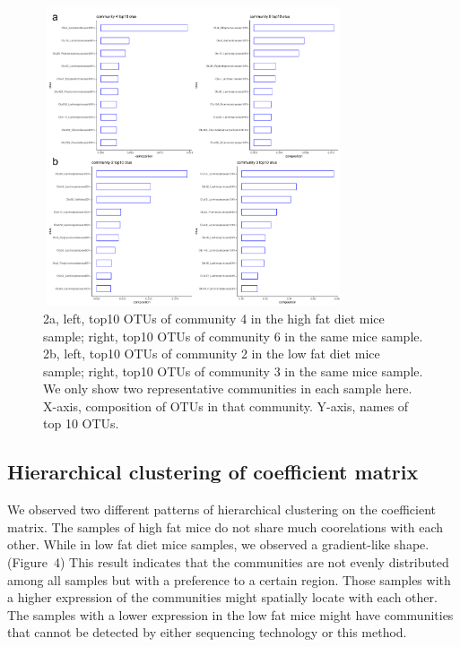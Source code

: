 \documentclass{bioinfo}
\begin{document}
\begin{figure}[!tpb]%
	\centerline{\includegraphics[width=250pt,height=250pt,keepaspectratio]{fig_2.pdf}}
	\caption{2a, left, top10 OTUs of community 4 in the high fat diet mice sample; right, top10 OTUs of community 6 in the same mice sample. 2b, left, top10 OTUs of community 2 in the low fat diet mice sample; right, top10 OTUs of community 3 in the same mice sample. We only show two representative communities in each sample here. X-axis, composition of OTUs in that community. Y-axis, names of top 10 OTUs.} \label{fig:02}
\end{figure}

\subsection{Hierarchical clustering of coefficient matrix}
We observed two different patterns of hierarchical clustering on the coefficient matrix. The samples of high fat mice do not share much coorelations with each other. While in low fat diet mice samples, we observed a gradient-like shape. (Figure~4\vphantom{\ref{fig:04}}) This result indicates that the communities are not evenly distributed among all samples but with a preference to a certain region. Those samples with a higher expression of the communities might spatially locate with each other. The samples with a lower expression in the low fat mice might have communities that cannot be detected by either sequencing technology or this method.
\end{document}
